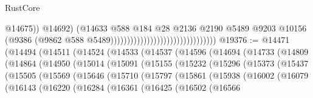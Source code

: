 \begin{lexlean}{RustCore}
\begin{coremodule}
                                                                    @14675))
                                                                @14692)
                                                              (@14633
                                                                @588
                                                                @184
                                                                @28
                                                                @2136
                                                                @2190
                                                                @5489
                                                                @9203
                                                                @10156
                                                                (@9386
                                                                  (@9862
                                                                    @588
                                                                    @5489))))))))))))))))))))))))))))))))
@19376 := @14471
    (@14494
      (@14511
        (@14524
          (@14533
            (@14537
              (@14596
                (@14694
                  (@14733
                    (@14809
                      (@14864
                        (@14950
                          (@15014
                            (@15091
                              (@15155
                                (@15232
                                  (@15296
                                    (@15373
                                      (@15437
                                        (@15505
                                          (@15569
                                            (@15646
                                              (@15710
                                                (@15797
                                                  (@15861
                                                    (@15938
                                                      (@16002
                                                        (@16079
                                                          (@16143
                                                            (@16220
                                                              (@16284
                                                                (@16361
                                                                  (@16425
                                                                    (@16502
                                                                      (@16566

\end{coremodule}
\end{lexlean}
